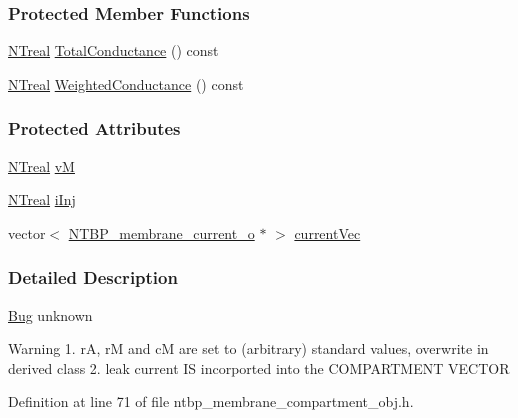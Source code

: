 \subsubsection*{Protected Member Functions}
\begin{DoxyCompactItemize}
\item 
\hyperlink{nt__types_8h_a814a97893e9deb1eedcc7604529ba80d}{NTreal} \hyperlink{class_n_t_b_p__membrane__compartment__o_aa564eac224a17fca81c20d758d55ca17}{TotalConductance} () const 
\item 
\hyperlink{nt__types_8h_a814a97893e9deb1eedcc7604529ba80d}{NTreal} \hyperlink{class_n_t_b_p__membrane__compartment__o_a423bd7522ba74c928ac0c4cd6c1f7a9b}{WeightedConductance} () const 
\end{DoxyCompactItemize}
\subsubsection*{Protected Attributes}
\begin{DoxyCompactItemize}
\item 
\hyperlink{nt__types_8h_a814a97893e9deb1eedcc7604529ba80d}{NTreal} \hyperlink{class_n_t_b_p__membrane__compartment__o_a9c3d7fb4b4f999e2bdc6894524cbc746}{vM}
\item 
\hyperlink{nt__types_8h_a814a97893e9deb1eedcc7604529ba80d}{NTreal} \hyperlink{class_n_t_b_p__membrane__compartment__o_ac3c92e3d16c6f1529c6c2755175d13bd}{iInj}
\item 
vector$<$ \hyperlink{class_n_t_b_p__membrane__current__o}{NTBP\_\-membrane\_\-current\_\-o} $\ast$ $>$ \hyperlink{class_n_t_b_p__membrane__compartment__o_af78c29eb837a8f317a9c9de0655493b0}{currentVec}
\end{DoxyCompactItemize}


\subsubsection{Detailed Description}
\begin{Desc}
\item[\hyperlink{bug__bug000064}{Bug}]unknown \end{Desc}
\begin{DoxyWarning}{Warning}
1. rA, rM and cM are set to (arbitrary) standard values, overwrite in derived class 2. leak current IS incorported into the COMPARTMENT VECTOR 
\end{DoxyWarning}


Definition at line 71 of file ntbp\_\-membrane\_\-compartment\_\-obj.h.



